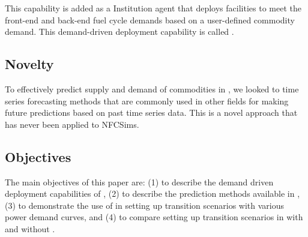 This capability is added as a \Cyclus Institution
agent that deploys facilities to meet the front-end and back-end 
fuel cycle demands based on a user-defined commodity demand. 
This demand-driven deployment capability is called 
\deploy. 

\subsection{Novelty}
To effectively predict supply and demand of commodities in 
\deploy, we looked to time series forecasting methods that are 
commonly used in other fields for making future predictions 
based on past time series data. 
This is a novel approach that has never been applied to 
\gls{NFCSim}s. 

\subsection{Objectives}
The main objectives of this paper are: 
(1) to describe the demand driven deployment capabilities of 
\Cyclus, (2) to describe the prediction methods available in 
\deploy, (3) to demonstrate the use of \deploy in setting up 
transition scenarios with various power demand curves, and (4) 
to compare setting up transition scenarios in \Cyclus with and 
without \deploy. 